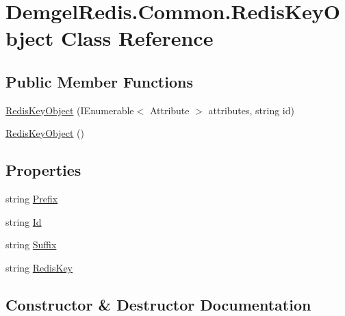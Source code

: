 \hypertarget{class_demgel_redis_1_1_common_1_1_redis_key_object}{}\section{Demgel\+Redis.\+Common.\+Redis\+Key\+Object Class Reference}
\label{class_demgel_redis_1_1_common_1_1_redis_key_object}
\subsection*{Public Member Functions}
\begin{DoxyCompactItemize}
\item 
\hyperlink{class_demgel_redis_1_1_common_1_1_redis_key_object_a51572d95a78df61c181ba084934ffbc1}{Redis\+Key\+Object} (I\+Enumerable$<$ Attribute $>$ attributes, string id)
\item 
\hyperlink{class_demgel_redis_1_1_common_1_1_redis_key_object_a953a8d79b7522ed7c83b048921bc7f7b}{Redis\+Key\+Object} ()
\end{DoxyCompactItemize}
\subsection*{Properties}
\begin{DoxyCompactItemize}
\item 
string \hyperlink{class_demgel_redis_1_1_common_1_1_redis_key_object_a34d0b8ed1d122aebbe305326ae74d9d1}{Prefix}
\item 
string \hyperlink{class_demgel_redis_1_1_common_1_1_redis_key_object_a2a0dbeb3a395a78e0bd07f40293cd9a3}{Id}
\item 
string \hyperlink{class_demgel_redis_1_1_common_1_1_redis_key_object_ac220e601714b3b2c192790f759c54dbc}{Suffix}
\item 
string \hyperlink{class_demgel_redis_1_1_common_1_1_redis_key_object_ad94d27558ce57f123e6441745b0238ff}{Redis\+Key}
\end{DoxyCompactItemize}


\subsection{Constructor \& Destructor Documentation}
\hypertarget{class_demgel_redis_1_1_common_1_1_redis_key_object_a51572d95a78df61c181ba084934ffbc1}{}
